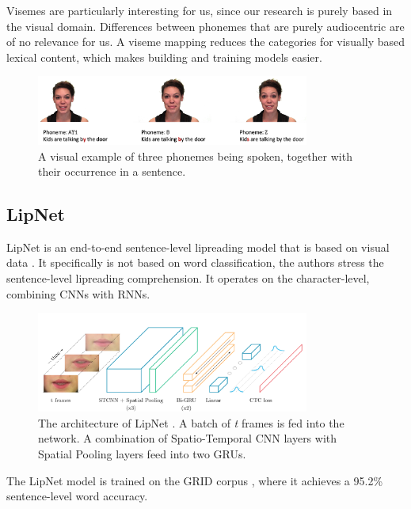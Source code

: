 Visemes are particularly interesting for us, since our research is purely based in the visual domain. Differences between phonemes that are purely audiocentric are of no relevance for us. A viseme mapping reduces the categories for visually based lexical content, which makes building and training models easier.

\begin{figure}
    \centering
    \includegraphics[width=0.8\textwidth]{res/phoneme.png}
    \caption{A visual example of three phonemes being spoken, together with their occurrence in a sentence.}
    \label{fig:phoneme_ex}
\end{figure}

\subsection{LipNet}

LipNet is an end-to-end sentence-level lipreading model that is based on visual data \cite{assael2016lipnet}. It specifically is not based on word classification, the authors stress the sentence-level lipreading comprehension. It operates on the character-level, combining CNNs with RNNs.

\begin{figure}
    \centering
    \includegraphics[width=0.8\textwidth]{res/lipnet.png}
    \caption{The architecture of LipNet \cite{assael2016lipnet}. A batch of \textit{t} frames is fed into the network. A combination of Spatio-Temporal CNN layers with Spatial Pooling layers feed into two GRUs.}
    \label{fig:lipnet}
\end{figure}

The LipNet model is trained on the GRID corpus \cite{cooke2006grid}, where it achieves a 95.2\% sentence-level word accuracy.

